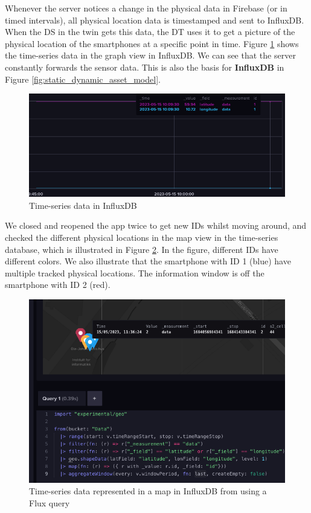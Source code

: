 \documentclass{article}
\begin{document}
Whenever the server notices a change in the physical data in Firebase (or in timed intervals), all physical location data is timestamped and sent to InfluxDB. When the DS in the twin gets this data, the DT uses it to get a picture of the physical location of the smartphones at a specific point in time. Figure \ref{fig:influx} shows the time-series data in the graph view in InfluxDB. We can see that the server constantly forwards the sensor data. This is also the basis for \textbf{InfluxDB} in Figure \ref{fig:static_dynamic_asset_model}.

\begin{figure}[H]
    \centering
    \includegraphics[scale=0.40]{graphics/influx.png}
    \caption{Time-series data in InfluxDB}
    \label{fig:influx}
\end{figure}

We closed and reopened the app twice to get new IDs whilst moving around, and checked the different physical locations in the map view in the time-series database, which is illustrated in Figure \ref{fig:influx_map}. In the figure, different IDs have different colors. We also illustrate that the smartphone with ID 1 (blue) have multiple tracked physical locations. The information window is off the smartphone with ID 2 (red).

\begin{figure}[H]
    \centering
    \includegraphics[scale=0.50]{graphics/influx_map.png}
    \caption{Time-series data represented in a map in InfluxDB from using a Flux query}
    \label{fig:influx_map}
\end{figure}
\end{document}
